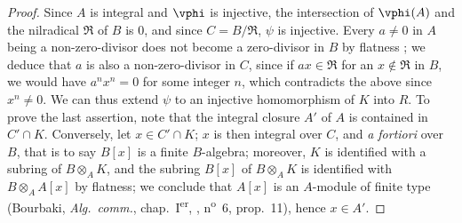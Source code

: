 \begin{proof}
Since $A$ is integral and $\vphi$ is injective, the intersection of $\vphi(A)$ and the nilradical $\mathfrak{R}$ of $B$ is $0$, and since $C=B/\mathfrak{R}$, $\psi$ is injective.
Every $a\neq 0$ in $A$ being a non-zero-divisor does not become a zero-divisor in $B$ by flatness ; we deduce that $a$ is also a non-zero-divisor in $C$, since if $ax\in\mathfrak{R}$ for an $x\notin\mathfrak{R}$ in $B$, we would have $a^nx^n=0$ for some integer $n$, which contradicts the above since $x^n\neq 0$.
We can thus extend $\psi$ to an injective homomorphism of $K$ into $R$.
To prove the last assertion, note that the integral closure $A'$ of $A$ is contained in $C'\cap K$.
Conversely, let $x\in C'\cap K$; $x$ is then integral over $C$, and \emph{a fortiori} over $B$, that is to say $B[x]$ is a finite $B$-algebra; moreover, $K$ is identified with a subring of $B\otimes_A K$, and the subring $B[x]$ of $B\otimes_A K$ is identified with $B\otimes_A A[x]$ by flatness; we conclude that $A[x]$ is an $A$-module of finite type (Bourbaki, \emph{Alg.~comm.}, chap.~I\textsuperscript{er}, , n\textsuperscript{o}~6, prop.~11), hence $x\in A'$.
\end{proof}

